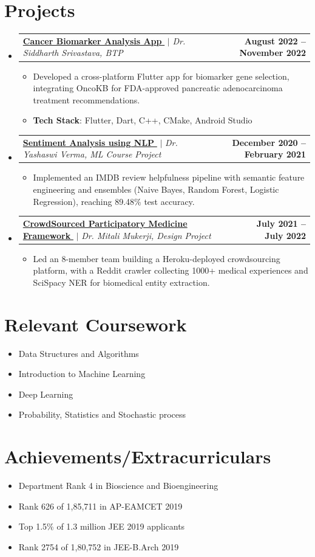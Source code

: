 \documentclass[letterpaper,10pt]{article}
\makeatletter
\let\orighref\href
\renewcommand{\href}[2]{\orighref{#1}{#2\,{\mdseries\faExternalLink}}}
\newcommand{\resumeItem}[1]{
  \item\small{#1}
}
\newcommand{\resumeProjectHeading}[2]{
    \vspace{2pt}\item
    \begin{tabular*}{\textwidth}{l@{\extracolsep{\fill}}r}
      \small#1 & \textbf{\small #2}\\
    \end{tabular*}
}
\newcommand{\resumeSubHeadingListStart}{\begin{itemize}[leftmargin=0.0in, itemsep=0pt, label={}]}
\newcommand{\resumeSubHeadingListEnd}{\end{itemize}}
\newcommand{\resumeItemListStart}{\begin{itemize}}
\newcommand{\resumeItemListEnd}{\end{itemize}}
\makeatother
\begin{document}
\section{Projects}
        \resumeSubHeadingListStart
      \resumeProjectHeading {\textbf{\href{https://github.com/ABharatSai/Cancer-Prediction-App}{Cancer Biomarker Analysis App}} $|$ \emph{Dr. Siddharth Srivastava, BTP}}{August 2022 -- November 2022}
\resumeItemListStart
\resumeItem{Developed a cross-platform Flutter app for biomarker gene selection, integrating OncoKB for FDA-approved pancreatic adenocarcinoma treatment recommendations.}
\resumeItem{\textbf{Tech Stack}: Flutter, Dart, C++, CMake, Android Studio}
\resumeItemListEnd

\resumeProjectHeading {\textbf{\href{https://github.com/ABharatSai/Sentiment_Analysis-using-NLP}{Sentiment Analysis using NLP}} $|$ \emph{Dr. Yashaswi Verma, ML Course Project}}{December 2020 -- February 2021}
\resumeItemListStart
\resumeItem{Implemented an IMDB review helpfulness pipeline with semantic feature engineering and ensembles (Naive Bayes, Random Forest, Logistic Regression), reaching 89.48\% test accuracy.}
\resumeItemListEnd

\resumeProjectHeading
{\textbf{\href{https://github.com/ABharatSai/CSPM}{CrowdSourced Participatory Medicine Framework}} $|$ \emph{Dr. Mitali Mukerji, Design Project}}{July 2021 -- July 2022}
\resumeItemListStart
\resumeItem{Led an 8-member team building a Heroku-deployed crowdsourcing platform, with a Reddit crawler collecting 1000+ medical experiences and SciSpacy NER for biomedical entity extraction.}
\resumeItemListEnd
    \resumeSubHeadingListEnd

\begin{minipage}[t]{0.48\textwidth}
\section{Relevant Coursework}
\begin{itemize}[itemsep=-3pt, parsep=2pt]
\item\small Data Structures and Algorithms
\item Introduction to Machine Learning
\item Deep Learning
\item Probability, Statistics and Stochastic process
\end{itemize}
\end{minipage}%
\hfill
\begin{minipage}[t]{0.48\textwidth}
\section{Achievements/Extracurriculars}
\begin{itemize}[itemsep=-3pt, parsep=2pt]
\item\small Department Rank 4 in Bioscience and Bioengineering
\item Rank 626 of 1,85,711 in AP-EAMCET 2019
\item Top 1.5\% of 1.3 million JEE 2019 applicants
\item Rank 2754 of 1,80,752 in JEE-B.Arch 2019
\end{itemize}
\end{minipage}
\end{document}
